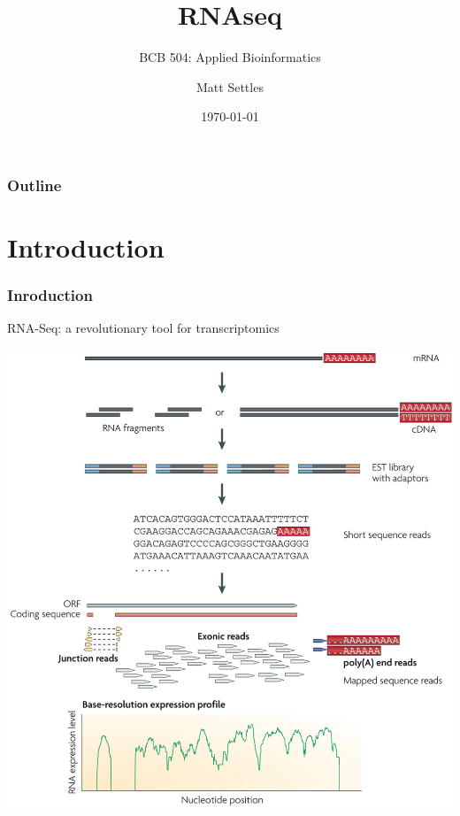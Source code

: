 \documentclass[pdf]{beamer}
\begin{document}
\title[RNAseq]{RNAseq}
\subtitle{BCB 504: Applied Bioinformatics\\}
\author[Matt Settles]{Matt Settles}
\date{\today}


\begin{frame}[plain]
  \titlepage
\end{frame}


\begin{frame}[plain] 
  \frametitle{Outline}
  \tableofcontents
\end{frame}

\section{Introduction}
\begin{frame}
  \frametitle{Inroduction}
\centering\alert{RNA-Seq: a revolutionary tool for transcriptomics}
\begin{center}
\includegraphics[scale=0.35]{Figures/nihms229948f1.jpg} 
\end{center}
\end{frame}
\end{document}
